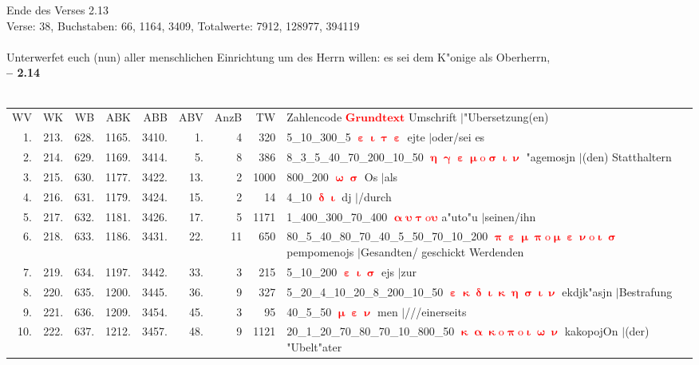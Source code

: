 \documentclass[a4paper,10pt,landscape]{article}
\begin{document}
Ende des Verses 2.13\\
Verse: 38, Buchstaben: 66, 1164, 3409, Totalwerte: 7912, 128977, 394119\\
\\
Unterwerfet euch (nun) aller menschlichen Einrichtung um des Herrn willen: es sei dem K"onige als Oberherrn,\\
\newpage 
{\bf -- 2.14}\\
\medskip \\
\begin{tabular}{rrrrrrrrp{120mm}}
WV&WK&WB&ABK&ABB&ABV&AnzB&TW&Zahlencode \textcolor{red}{$\boldsymbol{Grundtext}$} Umschrift $|$"Ubersetzung(en)\\
1.&213.&628.&1165.&3410.&1.&4&320&5\_10\_300\_5 \textcolor{red}{$\boldsymbol{\upepsilon\upiota\uptau\upepsilon}$} ejte $|$oder/sei es\\
2.&214.&629.&1169.&3414.&5.&8&386&8\_3\_5\_40\_70\_200\_10\_50 \textcolor{red}{$\boldsymbol{\upeta\upgamma\upepsilon\upmu\mathrm{o}\upsigma\upiota\upnu}$} "agemosjn $|$(den) Statthaltern\\
3.&215.&630.&1177.&3422.&13.&2&1000&800\_200 \textcolor{red}{$\boldsymbol{\upomega\upsigma}$} Os $|$als\\
4.&216.&631.&1179.&3424.&15.&2&14&4\_10 \textcolor{red}{$\boldsymbol{\updelta\upiota}$} dj $|$/durch\\
5.&217.&632.&1181.&3426.&17.&5&1171&1\_400\_300\_70\_400 \textcolor{red}{$\boldsymbol{\upalpha\upsilon\uptau\mathrm{o}\upsilon}$} a"uto"u $|$seinen/ihn\\
6.&218.&633.&1186.&3431.&22.&11&650&80\_5\_40\_80\_70\_40\_5\_50\_70\_10\_200 \textcolor{red}{$\boldsymbol{\uppi\upepsilon\upmu\uppi\mathrm{o}\upmu\upepsilon\upnu\mathrm{o}\upiota\upsigma}$} pempomenojs $|$Gesandten/ geschickt Werdenden\\
7.&219.&634.&1197.&3442.&33.&3&215&5\_10\_200 \textcolor{red}{$\boldsymbol{\upepsilon\upiota\upsigma}$} ejs $|$zur\\
8.&220.&635.&1200.&3445.&36.&9&327&5\_20\_4\_10\_20\_8\_200\_10\_50 \textcolor{red}{$\boldsymbol{\upepsilon\upkappa\updelta\upiota\upkappa\upeta\upsigma\upiota\upnu}$} ekdjk"asjn $|$Bestrafung\\
9.&221.&636.&1209.&3454.&45.&3&95&40\_5\_50 \textcolor{red}{$\boldsymbol{\upmu\upepsilon\upnu}$} men $|$///einerseits\\
10.&222.&637.&1212.&3457.&48.&9&1121&20\_1\_20\_70\_80\_70\_10\_800\_50 \textcolor{red}{$\boldsymbol{\upkappa\upalpha\upkappa\mathrm{o}\uppi\mathrm{o}\upiota\upomega\upnu}$} kakopojOn $|$(der) "Ubelt"ater\\

\end{tabular}
\end{document}
